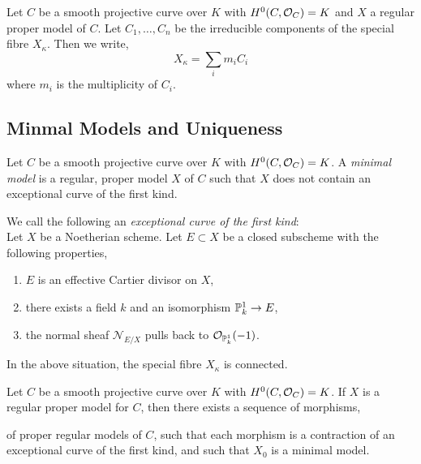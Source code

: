 \documentclass[12pt]{article}
\begin{document}
\begin{definition}
Let $C$ be a smooth projective curve over $K$ with $H^0(C, \struct{C}) = K$ and $X$ a regular proper model of $C$. Let $C_1, \dots, C_n$ be the irreducible components of the special fibre $X_\kappa$. Then we write,
\[ X_\kappa = \sum_i m_i C_i \]
where $m_i$ is the multiplicity of $C_i$. 
\end{definition}


\subsection{Minmal Models and Uniqueness}

\begin{definition}
Let $C$ be a smooth projective curve over $K$ with $H^0(C, \struct{C}) = K$. A \textit{minimal model} is a regular, proper model $X$ of $C$ such that $X$ does not contain an exceptional curve of the first kind. 
\end{definition}

\begin{definition}
We call the following an \textit{exceptional curve of the first kind}:
\bigskip\\
Let $X$ be a Noetherian scheme. Let $E \subset X$ be a closed subscheme with the following properties,
\begin{enumerate}
\item $E$ is an effective Cartier divisor on $X$,
\item there exists a field $k$ and an isomorphism $\P^1_k \to E$,
\item the normal sheaf $\mathcal{N}_{E/X}$ pulls back to $\struct{\P^1_k}(-1)$. 
\end{enumerate}
\end{definition}

\begin{lemma}
In the above situation, the special fibre $X_\kappa$ is connected. 
\end{lemma}

\begin{lemma}
Let $C$ be a smooth projective curve over $K$ with $H^0(C, \struct{C}) = K$. If $X$ is a regular proper model for $C$, then there exists a sequence of morphisms,
\begin{center}
\end{center}
of proper regular models of $C$, such that each morphism is a contraction of an exceptional curve of the first kind, and such that $X_0$ is a minimal model.
\end{lemma}
\end{document}
